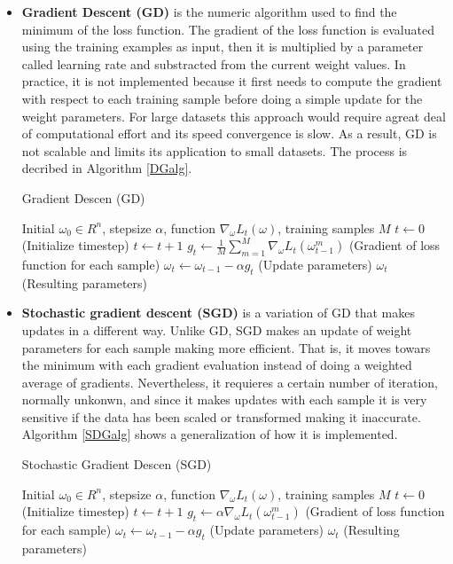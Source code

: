 \begin{itemize}
\item \textbf{Gradient Descent (GD)} is the numeric algorithm used to find the minimum of the loss function. The gradient of the loss function is evaluated using the training examples as input, then it is multiplied by a parameter called learning rate and substracted from the current weight values. In practice, it is not implemented because it first needs to compute the gradient with respect to each training sample before doing a simple update for the weight parameters. For large datasets this approach would require agreat deal of computational effort and its speed convergence is slow. As a result, GD is not scalable and limits its application to small datasets. The process is decribed in Algorithm \ref{DGalg}.  

\begin{algorithm}
\caption{Gradient Descen (GD)}
\label{DGalg}
\begin{algorithmic}[1]
    \Require Initial $ \omega_0 \in R^n $, stepsize $\alpha  $, function $\nabla_{\omega} L_t ( \omega )$, training samples $M$
    \State $t \leftarrow 0$ (Initialize timestep)
        \State $t \leftarrow t+1$ 
        \State $g_t \leftarrow \frac{1}{M} \sum_{m=1}^M \nabla_{\omega} L_t ( \omega_{t-1}^{m} )$ (Gradient of loss function for each sample) 
        \State $\omega_t \leftarrow \omega_{t-1} - \alpha g_t $ (Update parameters)
    \EndWhile
    \State \Return $\omega_t $ (Resulting parameters)   
\end{algorithmic}
\end{algorithm}

\item \textbf{Stochastic gradient descent (SGD)} is a variation of GD that makes updates in a different way. Unlike GD, SGD makes an update of weight parameters for each sample making more efficient. That is, it moves towars the minimum with each gradient evaluation instead of doing a weighted average of gradients. Nevertheless, it requieres a certain number of iteration, normally unkonwn, and since it makes updates with each sample it is very sensitive if the data has been scaled or transformed making it inaccurate. Algorithm  \ref{SDGalg} shows a generalization of how it is implemented.

\begin{algorithm}
\caption{Stochastic Gradient Descen (SGD)}
\label{SDGalg}
\begin{algorithmic}[1]
    \Require Initial $ \omega_0 \in R^n $, stepsize $\alpha  $, function $\nabla_{\omega} L_t ( \omega )$, training samples $M$
    \State $t \leftarrow 0$ (Initialize timestep)
    \State $t \leftarrow t+1$
    \State $ g_t \leftarrow \alpha \nabla_{\omega} L_t ( \omega_{t-1}^{m} )$ (Gradient of loss function for each sample) 
    \State $\omega_t \leftarrow \omega_{t-1} - \alpha g_t $ (Update parameters)
        \EndFor
    \EndWhile
    \State \Return $\omega_t $ (Resulting parameters)   
\end{algorithmic}
\end{algorithm}


\end{itemize}
